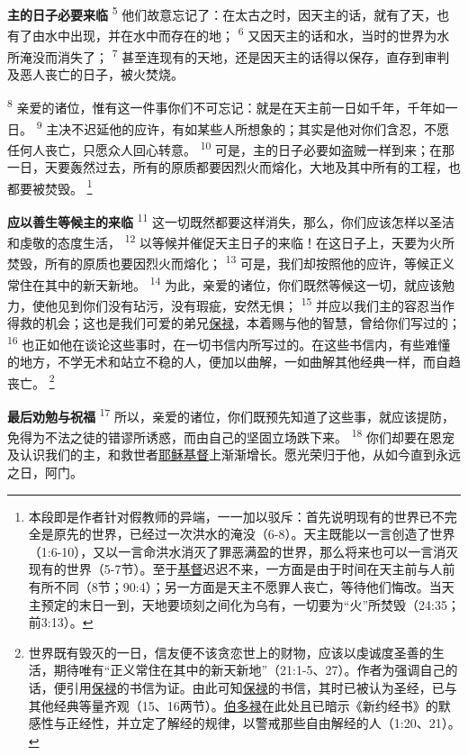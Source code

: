 \textbf{主的日子必要来临\quad}
\textsuperscript{5}
他们故意忘记了：在太古之时，因天主的话，就有了天，也有了由水中出现，并在水中而存在的地；
\textsuperscript{6}
又因天主的话和水，当时的世界为水所淹没而消失了；
\textsuperscript{7}
甚至连现有的天地，还是因天主的话得以保存，直存到审判及恶人丧亡的日子，被火焚烧。

\textsuperscript{8}
亲爱的诸位，惟有这一件事你们不可忘记：就是在天主前一日如千年，千年如一日。
\textsuperscript{9}
主决不迟延他的应许，有如某些人所想象的；其实是他对你们含忍，不愿任何人丧亡，只愿众人回心转意。
\textsuperscript{10}
可是，主的日子必要如盗贼一样到来；在那一日，天要轰然过去，所有的原质都要因烈火而熔化，大地及其中所有的工程，也都要被焚毁。
\footnote{本段即是作者针对假教师的异端，一一加以驳斥：首先说明现有的世界已不完全是原先的世界，已经过一次洪水的淹没（6-8）。天主既能以一言创造了世界（1:6-10），又以一言命洪水消灭了罪恶满盈的世界，那么将来也可以一言消灭现有的世界（5-7节）。至于\uline{基督}迟迟不来，一方面是由于时间在天主前与人前有所不同（8节；90:4）；另一方面是天主不愿罪人丧亡，等待他们悔改。当天主预定的末日一到，天地要顷刻之间化为乌有，一切要为“火”所焚毁（24:35；前3:13）。}

\textbf{应以善生等候主的来临\quad}
\textsuperscript{11}
这一切既然都要这样消失，那么，你们应该怎样以圣洁和虔敬的态度生活，
\textsuperscript{12}
以等候并催促天主日子的来临！在这日子上，天要为火所焚毁，所有的原质也要因烈火而熔化；
\textsuperscript{13}
可是，我们却按照他的应许，等候正义常住在其中的新天新地。
\textsuperscript{14}
为此，亲爱的诸位，你们既然等候这一切，就应该勉力，使他见到你们没有玷污，没有瑕疵，安然无惧；
\textsuperscript{15}
并应以我们主的容忍当作得救的机会；这也是我们可爱的弟兄\uline{保禄}，本着赐与他的智慧，曾给你们写过的；
\textsuperscript{16}
也正如他在谈论这些事时，在一切书信内所写过的。在这些书信内，有些难懂的地方，不学无术和站立不稳的人，便加以曲解，一如曲解其他经典一样，而自趋丧亡。
\footnote{世界既有毁灭的一日，信友便不该贪恋世上的财物，应该以虔诚度圣善的生活，期待唯有“正义常住在其中的新天新地”（21:1-5、27）。作者为强调自己的话，便引用\uline{保禄}的书信为证。由此可知\uline{保禄}的书信，其时已被认为圣经，已与其他经典等量齐观（15、16两节）。\uline{伯多禄}在此处且已暗示《新约经书》的默感性与正经性，并立定了解经的规律，以警戒那些自由解经的人（1:20、21）。}

\textbf{最后劝勉与祝福\quad}
\textsuperscript{17}
所以，亲爱的诸位，你们既预先知道了这些事，就应该提防，免得为不法之徒的错谬所诱惑，而由自己的坚固立场跌下来。
\textsuperscript{18}
你们却要在恩宠及认识我们的主，和救世者\uline{耶稣}\uline{基督}上渐渐增长。愿光荣归于他，从如今直到永远之日，阿门。